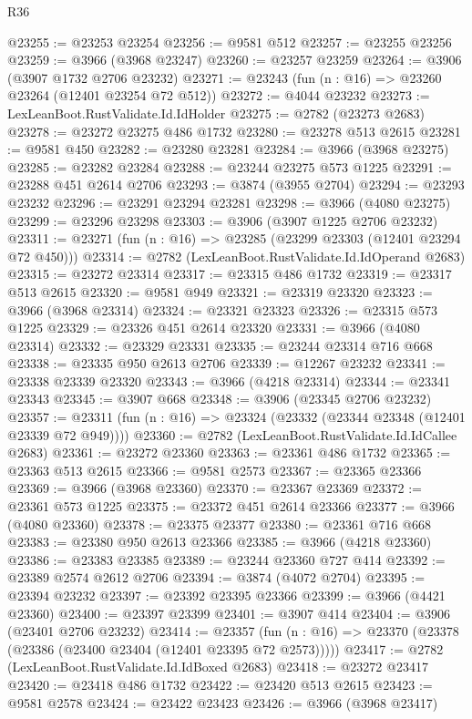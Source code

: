 \begin{lexlean}{R36}
\begin{coremodule}
@23255 := @23253 @23254
@23256 := @9581 @512
@23257 := @23255 @23256
@23259 := @3966 (@3968 @23247)
@23260 := @23257 @23259
@23264 := @3906 (@3907 @1732 @2706 @23232)
@23271 := @23243 (fun (n : @16) => @23260 @23264 (@12401 @23254 @72 @512))
@23272 := @4044 @23232
@23273 := LexLeanBoot.RustValidate.Id.IdHolder
@23275 := @2782 (@23273 @2683)
@23278 := @23272 @23275 @486 @1732
@23280 := @23278 @513 @2615
@23281 := @9581 @450
@23282 := @23280 @23281
@23284 := @3966 (@3968 @23275)
@23285 := @23282 @23284
@23288 := @23244 @23275 @573 @1225
@23291 := @23288 @451 @2614 @2706
@23293 := @3874 (@3955 @2704)
@23294 := @23293 @23232
@23296 := @23291 @23294 @23281
@23298 := @3966 (@4080 @23275)
@23299 := @23296 @23298
@23303 := @3906 (@3907 @1225 @2706 @23232)
@23311 := @23271 (fun (n : @16) => @23285 (@23299 @23303 (@12401 @23294 @72 @450)))
@23314 := @2782 (LexLeanBoot.RustValidate.Id.IdOperand @2683)
@23315 := @23272 @23314
@23317 := @23315 @486 @1732
@23319 := @23317 @513 @2615
@23320 := @9581 @949
@23321 := @23319 @23320
@23323 := @3966 (@3968 @23314)
@23324 := @23321 @23323
@23326 := @23315 @573 @1225
@23329 := @23326 @451 @2614 @23320
@23331 := @3966 (@4080 @23314)
@23332 := @23329 @23331
@23335 := @23244 @23314 @716 @668
@23338 := @23335 @950 @2613 @2706
@23339 := @12267 @23232
@23341 := @23338 @23339 @23320
@23343 := @3966 (@4218 @23314)
@23344 := @23341 @23343
@23345 := @3907 @668
@23348 := @3906 (@23345 @2706 @23232)
@23357 := @23311 (fun (n : @16) => @23324 (@23332 (@23344 @23348 (@12401 @23339 @72 @949))))
@23360 := @2782 (LexLeanBoot.RustValidate.Id.IdCallee @2683)
@23361 := @23272 @23360
@23363 := @23361 @486 @1732
@23365 := @23363 @513 @2615
@23366 := @9581 @2573
@23367 := @23365 @23366
@23369 := @3966 (@3968 @23360)
@23370 := @23367 @23369
@23372 := @23361 @573 @1225
@23375 := @23372 @451 @2614 @23366
@23377 := @3966 (@4080 @23360)
@23378 := @23375 @23377
@23380 := @23361 @716 @668
@23383 := @23380 @950 @2613 @23366
@23385 := @3966 (@4218 @23360)
@23386 := @23383 @23385
@23389 := @23244 @23360 @727 @414
@23392 := @23389 @2574 @2612 @2706
@23394 := @3874 (@4072 @2704)
@23395 := @23394 @23232
@23397 := @23392 @23395 @23366
@23399 := @3966 (@4421 @23360)
@23400 := @23397 @23399
@23401 := @3907 @414
@23404 := @3906 (@23401 @2706 @23232)
@23414 := @23357
    (fun (n : @16) => @23370 (@23378 (@23386 (@23400 @23404 (@12401 @23395 @72 @2573)))))
@23417 := @2782 (LexLeanBoot.RustValidate.Id.IdBoxed @2683)
@23418 := @23272 @23417
@23420 := @23418 @486 @1732
@23422 := @23420 @513 @2615
@23423 := @9581 @2578
@23424 := @23422 @23423
@23426 := @3966 (@3968 @23417)

\end{coremodule}
\end{lexlean}
